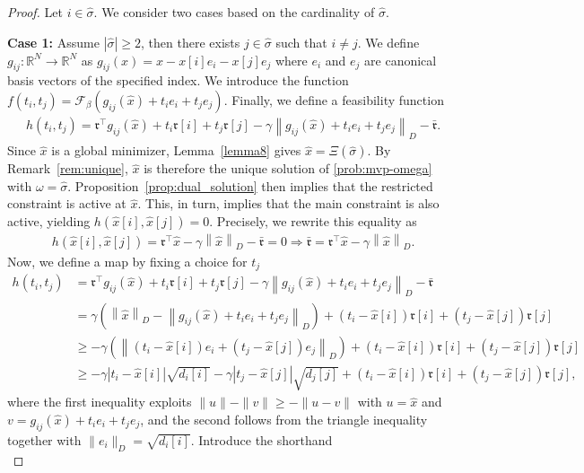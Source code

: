 \documentclass[11pt]{article}
\theoremstyle{plain}
\theoremstyle{definition}
\theoremstyle{plain}
\newcommand{\RR}{{\mathbb R}} %
\newcommand{\norm}[1]{\left\lVert#1\right\rVert}
\newcommand{\abs}[1]{\left\lvert#1\right\rvert}
\newcommand{\tpose}[1]{#1^{\top}}
\newcommand{\cF}{{\mathcal F}}
\newcommand{\ccr}{{\mathfrak r}}
\begin{document}
\begin{proof}
    Let $i\in\hat{\sigma}$. We consider two cases based on the cardinality of $\hat{\sigma}$.

    \textbf{Case 1:} Assume $\abs{\hat{\sigma}}\geq 2$, then there exists $j\in\hat{\sigma}$ such that $i\neq j$. We define $g_{ij}:\RR^N\rightarrow \RR^N$ as $g_{ij}(x)=x-x[i]e_i-x[j]e_j$ where $e_i$ and $e_j$ are canonical basis vectors of the specified index. We introduce the function $f(t_i,t_j)=\cF_\beta(g_{ij}(\hat{x})+t_ie_i+t_je_j)$. Finally, we define a feasibility function
    \begin{align*}
        h(t_i,t_j)=\tpose{\ccr}g_{ij}(\hat{x})+t_i\ccr[i]+t_j\ccr[j]-\gamma\norm{g_{ij}(\hat{x})+t_ie_i+t_je_j}_D-\bar{\ccr}.
    \end{align*}
   Since $\hat{x}$ is a global minimizer, Lemma~\ref{lemma8} gives $\hat{x}=\Xi(\hat{\sigma})$.  By Remark~\ref{rem:unique}, $\hat{x}$ is therefore the unique solution of \eqref{prob:mvp-omega} with $\omega=\hat{\sigma}$. Proposition~\ref{prop:dual_solution} then implies that the restricted constraint is active at $\hat{x}$. This, in turn,  implies that the main constraint is also active, yielding $h(\hat{x}[i],\hat{x}[j])= 0$. Precisely, we rewrite this equality as
    \begin{align*}
        h(\hat{x}[i],\hat{x}[j])=\tpose{\ccr}\hat{x}-\gamma\norm{\hat{x}}_D-\bar{\ccr}=0\Rightarrow \bar{\ccr}=\tpose{\ccr}\hat{x}-\gamma\norm{\hat{x}}_D.
    \end{align*}
    Now, we define a map by fixing a choice for $t_j$
    \begin{align*}
        h(t_i,t_j)&=\tpose{\ccr}g_{ij}(\hat{x})+t_i\ccr[i]+t_j\ccr[j]-\gamma\norm{g_{ij}(\hat{x})+t_ie_i+t_je_j}_D-\bar{\ccr}\\
        &=\gamma\left(\norm{\hat{x}}_D-\norm{g_{ij}(\hat{x})+t_ie_i+t_je_j}_D\right)+(t_i-\hat{x}[i])\ccr[i]+(t_j-\hat{x}[j])\ccr[j]\\&
        \geq-\gamma\left(\norm{(t_i-\hat{x}[i])e_i+(t_j-\hat{x}[j])e_j}_D\right)+(t_i-\hat{x}[i])\ccr[i]+(t_j-\hat{x}[j])\ccr[j]\\&
        \geq -\gamma\abs{t_i-\hat{x}[i]}\sqrt{d_i[i]}-\gamma\abs{t_j-\hat{x}[j]}\sqrt{d_j[j]}+(t_i-\hat{x}[i])\ccr[i]+(t_j-\hat{x}[j])\ccr[j] ,
    \end{align*}
    where the first inequality exploits  $\|u\|-\|v\|\geq -\|u-v\|$ with $u=\hat x$ and $v=g_{ij}(\hat x)+ t_i e_i+t_je_j$, and the second follows from the triangle inequality together with $\|e_i\|_D=\sqrt{d_i[i]}$. Introduce the shorthand  \[
\]
\end{proof}
\end{document}
